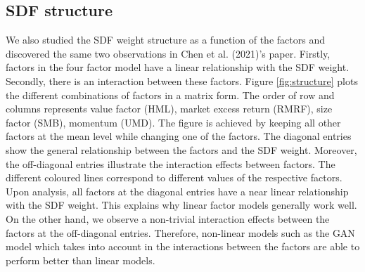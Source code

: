 \documentclass[12pt]{article}
\begin{document}
\newpage

\hypertarget{sdf-structure}{%
\subsection{SDF structure}\label{sdf-structure}}

We also studied the SDF weight structure as a function of the
factors and discovered the same two observations in
Chen et al. (2021)'s paper.
Firstly, factors in the four factor model have a linear relationship
with the SDF weight.
Secondly, there is an interaction
between these factors.
Figure \ref{fig:structure} plots the different combinations
of factors in a matrix form. The order of row and columns
represents value factor (HML), market excess return (RMRF),
size factor (SMB), momentum (UMD). The figure is achieved by
keeping all other factors at the mean level while changing
one of the factors.
The diagonal entries
show the general relationship between the factors and the SDF
weight. Moreover, the off-diagonal entries illustrate the
interaction effects between factors.
The different coloured lines correspond to different values of the
respective factors.
Upon analysis, all factors at the diagonal entries have a near
linear relationship with the SDF weight. This explains why
linear factor models generally work well.
On the other hand, we observe a
non-trivial interaction effects between the factors at the
off-diagonal entries.
Therefore, non-linear models such as the GAN model which
takes into account in the interactions between the factors
are able to perform better than linear models.

\newpage
\end{document}
